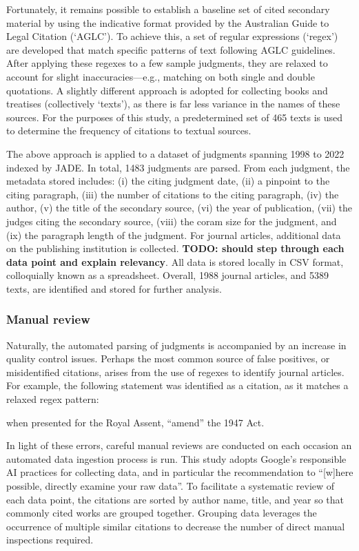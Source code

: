 Fortunately, it remains possible to establish a baseline set of cited secondary material by using the indicative format provided by the Australian Guide to Legal Citation (`AGLC'). To achieve this, a set of regular expressions (`regex') are developed that match specific patterns of text following AGLC guidelines. After applying these regexes to a few sample judgments, they are relaxed to account for slight inaccuracies---e.g., matching on both single and double quotations. A slightly different approach is adopted for collecting books and treatises (collectively `texts'), as there is far less variance in the names of these sources. For the purposes of this study, a predetermined set of 465 texts is used to determine the frequency of citations to textual sources.

The above approach is applied to a dataset of judgments spanning 1998 to 2022 indexed by JADE. In total, 1483 judgments are parsed. From each judgment, the metadata stored includes: (i) the citing judgment date, (ii) a pinpoint to the citing paragraph, (iii) the number of citations to the citing paragraph, (iv) the author, (v) the title of the secondary source, (vi) the year of publication, (vii) the judges citing the secondary source, (viii) the coram size for the judgment, and (ix) the paragraph length of the judgment. For journal articles, additional data on the publishing institution is collected. \textbf{TODO: should step through each data point and explain relevancy}. All data is stored locally in CSV format, colloquially known as a spreadsheet. Overall, 1988 journal articles, and 5389 texts, are identified and stored for further analysis.

\subsubsection{Manual review}

Naturally, the automated parsing of judgments is accompanied by an increase in quality control issues. Perhaps the most common source of false positives, or misidentified citations, arises from the use of regexes to identify journal articles. For example, the following statement was identified as a citation, as it matches a relaxed regex pattern:

\begin{center}
when presented for the Royal Assent, ``amend'' the 1947 Act.
\end{center}

In light of these errors, careful manual reviews are conducted on each occasion an automated data ingestion process is run. This study adopts Google's responsible AI practices for collecting data, and in particular the recommendation to ``[w]here possible, directly examine your raw data''. To facilitate a systematic review of each data point, the citations are sorted by author name, title, and year so that commonly cited works are grouped together. Grouping data leverages the occurrence of multiple similar citations to decrease the number of direct manual inspections required.

